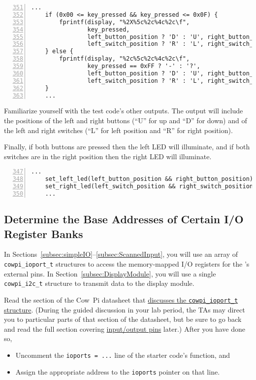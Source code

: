 \begin{lstlisting}[numberstyle=\color{gray}, numbers=left, firstnumber=351, basicstyle=\ttfamily\small]
    ...
    if (0x00 <= key_pressed && key_pressed <= 0x0F) {
        fprintf(display, "%2X%5c%2c%4c%2c\f",
                key_pressed,
                left_button_position ? 'D' : 'U', right_button_position ? 'D' : 'U',
                left_switch_position ? 'R' : 'L', right_switch_position ? 'R' : 'L');
    } else {
        fprintf(display, "%2c%5c%2c%4c%2c\f",
                key_pressed == 0xFF ? '-' : '?',
                left_button_position ? 'D' : 'U', right_button_position ? 'D' : 'U',
                left_switch_position ? 'R' : 'L', right_switch_position ? 'R' : 'L');
    }
    ...
\end{lstlisting}

Familiarize yourself with the test code's other outputs.
The output will include the positions of the left and right buttons (``U'' for up and ``D'' for down) and of the left and right switches (``L'' for left position and ``R'' for right position).

Finally, if both buttons are pressed then the left LED will illuminate, and if both switches are in the right position then the right LED will illuminate.

\begin{lstlisting}[numberstyle=\color{gray}, numbers=left, firstnumber=347]
    ...
    set_left_led(left_button_position && right_button_position);
    set_right_led(left_switch_position && right_switch_position);
    ...
\end{lstlisting}


\subsection{Determine the Base Addresses of Certain I/O Register Banks} \label{subsec:baseAddresses}

In Sections~\ref{subsec:simpleIO}--\ref{subsec:ScannedInput}, you will use an array of \lstinline{cowpi_ioport_t} structures to access the memory-mapped I/O registers for the \developmentboard's external pins.
In Section~\ref{subsec:DisplayModule}, you will use a single \lstinline{cowpi_i2c_t} structure to transmit data to the display module.

Read the section of the Cow~Pi datasheet that \href{https://cow-pi.readthedocs.io/en/latest/microcontroller.html#structure-for-memory-mapped-input-output}{discusses the \lstinline{cowpi_ioport_t} structure}.
(During the guided discussion in your lab period, the TAs may direct you to particular parts of that section of the datasheet,
but be sure to go back and read the full section covering \href{https://cow-pi.readthedocs.io/en/latest/microcontroller.html#external-pins-input-output}{input/output pins} later.)
After you have done so,
\begin{itemize}
    \item Uncomment the \lstinline{ioports = ...} line of the starter code's  function, and
    \item Assign the appropriate address to the \lstinline{ioports} pointer on that line.
\end{itemize}

